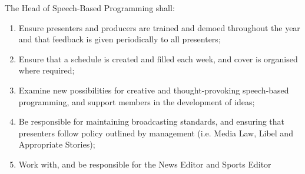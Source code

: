 \item The Head of Speech-Based Programming shall:
\begin{enumerate}[label*=\arabic*.]
    \item Ensure presenters and producers are trained and demoed throughout the year and that feedback is given periodically to all presenters;
    \item Ensure that a schedule is created and filled each week, and cover is organised where required;
    \item Examine new possibilities for creative and thought-provoking speech-based programming, and support members in the development of ideas;
    \item Be responsible for maintaining broadcasting standards, and ensuring that presenters follow policy outlined by management (i.e. Media Law, Libel and Appropriate Stories);
    \item Work with, and be responsible for the News Editor and Sports Editor
\end{enumerate}
